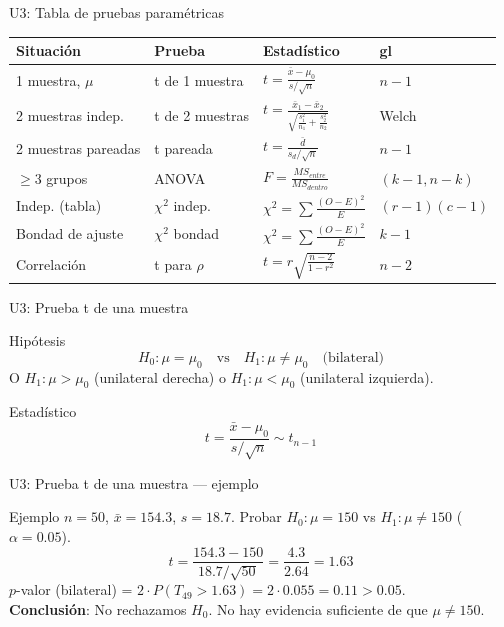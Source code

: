 \documentclass[aspectratio=169, 11pt]{beamer}
\begin{document}
\begin{frame}{U3: Tabla de pruebas paramétricas}
\small
\begin{center}
\renewcommand{\arraystretch}{1.4}
\begin{tabular}{llll}
\toprule
\textbf{Situación} & \textbf{Prueba} & \textbf{Estadístico} & \textbf{gl} \\
\midrule
1 muestra, $\mu$ & t de 1 muestra & $t = \frac{\bar{x} - \mu_0}{s/\sqrt{n}}$ & $n-1$ \\
\midrule
2 muestras indep. & t de 2 muestras & $t = \frac{\bar{x}_1 - \bar{x}_2}{\sqrt{\frac{s_1^2}{n_1} + \frac{s_2^2}{n_2}}}$ & Welch \\
\midrule
2 muestras pareadas & t pareada & $t = \frac{\bar{d}}{s_d/\sqrt{n}}$ & $n-1$ \\
\midrule
$\geq 3$ grupos & ANOVA & $F = \frac{MS_{entre}}{MS_{dentro}}$ & $(k-1, n-k)$ \\
\midrule
Indep. (tabla) & $\chi^2$ indep. & $\chi^2 = \sum \frac{(O-E)^2}{E}$ & $(r-1)(c-1)$ \\
\midrule
Bondad de ajuste & $\chi^2$ bondad & $\chi^2 = \sum \frac{(O-E)^2}{E}$ & $k-1$ \\
\midrule
Correlación & t para $\rho$ & $t = r\sqrt{\frac{n-2}{1-r^2}}$ & $n-2$ \\
\bottomrule
\end{tabular}
\end{center}
\end{frame}

\begin{frame}{U3: Prueba t de una muestra}
\begin{block}{Hipótesis}
$$H_0: \mu = \mu_0 \quad \text{vs} \quad H_1: \mu \neq \mu_0 \quad \text{(bilateral)}$$
O $H_1: \mu > \mu_0$ (unilateral derecha) o $H_1: \mu < \mu_0$ (unilateral izquierda).
\end{block}

\begin{block}{Estadístico}
$$t = \frac{\bar{x} - \mu_0}{s/\sqrt{n}} \sim t_{n-1}$$
\end{block}
\end{frame}

\begin{frame}{U3: Prueba t de una muestra --- ejemplo}
\begin{exampleblock}{Ejemplo}
$n = 50$, $\bar{x} = 154.3$, $s = 18.7$. Probar $H_0: \mu = 150$ vs $H_1: \mu \neq 150$ ($\alpha = 0.05$).
$$t = \frac{154.3 - 150}{18.7/\sqrt{50}} = \frac{4.3}{2.64} = 1.63$$
$p$-valor (bilateral) = $2 \cdot P(T_{49} > 1.63) = 2 \cdot 0.055 = 0.11 > 0.05$.\\
\textbf{Conclusión}: No rechazamos $H_0$. No hay evidencia suficiente de que $\mu \neq 150$.
\end{exampleblock}
\end{frame}
\end{document}
